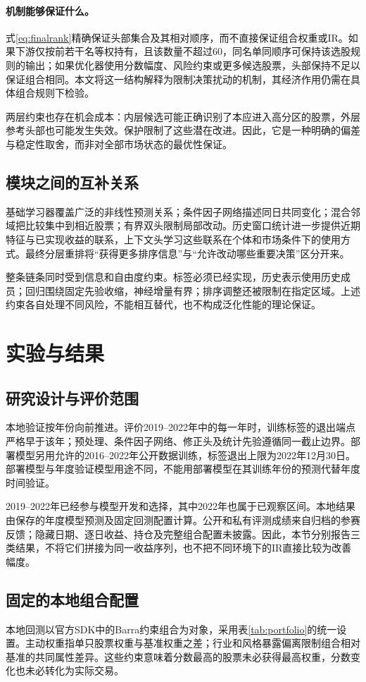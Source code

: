 \documentclass[UTF8,11pt,a4paper,fontset=fandol]{ctexart}
\begin{document}
\paragraph{机制能够保证什么。}
式\eqref{eq:finalrank}精确保证头部集合及其相对顺序，而不直接保证组合权重或IR。如果下游仅按前若干名等权持有，且该数量不超过60，同名单同顺序可保持该选股规则的输出；如果优化器使用分数幅度、风险约束或更多候选股票，头部保持不足以保证组合相同。本文将这一结构解释为限制决策扰动的机制，其经济作用仍需在具体组合规则下检验。

两层约束也存在机会成本：内层候选可能正确识别了本应进入高分区的股票，外层参考头部也可能发生失效。保护限制了这些潜在改进。因此，它是一种明确的偏差与稳定性取舍，而非对全部市场状态的最优性保证。

\subsection{模块之间的互补关系}
基础学习器覆盖广泛的非线性预测关系；条件因子网络描述同日共同变化；混合邻域把比较集中到相近股票；有界双头限制局部改动。历史窗口统计进一步提供近期特征与已实现收益的联系，上下文头学习这些联系在个体和市场条件下的使用方式。最终分层重排将“获得更多排序信息”与“允许改动哪些重要决策”区分开来。

整条链条同时受到信息和自由度约束。标签必须已经实现，历史表示使用历史成员；回归围绕固定先验收缩，神经增量有界；排序调整还被限制在指定区域。上述约束各自处理不同风险，不能相互替代，也不构成泛化性能的理论保证。

\section{实验与结果}
\subsection{研究设计与评价范围}
本地验证按年份向前推进。评价2019--2022年中的每一年时，训练标签的退出端点严格早于该年；预处理、条件因子网络、修正头及统计先验遵循同一截止边界。部署模型另用允许的2016--2022年公开数据训练，标签退出上限为2022年12月30日。部署模型与年度验证模型用途不同，不能用部署模型在其训练年份的预测代替年度时间验证。

2019--2022年已经参与模型开发和选择，其中2022年也属于已观察区间。本地结果由保存的年度模型预测及固定回测配置计算。公开和私有评测成绩来自归档的参赛反馈；隐藏日期、逐日收益、持仓及完整组合配置未披露。因此，本节分别报告三类结果，不将它们拼接为同一收益序列，也不把不同环境下的IR直接比较为改善幅度。

\subsection{固定的本地组合配置}
本地回测以官方SDK中的Barra约束组合为对象，采用表\ref{tab:portfolio}的统一设置。主动权重指单只股票权重与基准权重之差；行业和风格暴露偏离限制组合相对基准的共同属性差异。这些约束意味着分数最高的股票未必获得最高权重，分数变化也未必转化为实际交易。
\end{document}

